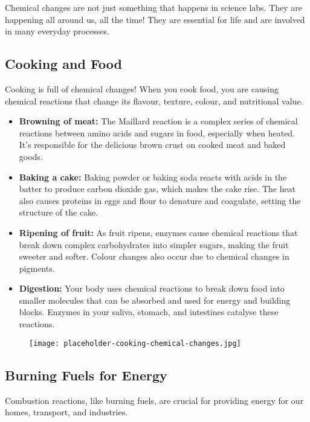 Chemical changes are not just something that happens in science labs. They are happening all around us, all the time!  They are essential for life and are involved in many everyday processes.

\subsection{Cooking and Food}

Cooking is full of chemical changes! When you cook food, you are causing chemical reactions that change its flavour, texture, colour, and nutritional value.

\begin{itemize}
    \item \textbf{Browning of meat:}  The Maillard reaction is a complex series of chemical reactions between amino acids and sugars in food, especially when heated. It's responsible for the delicious brown crust on cooked meat and baked goods.
    \item \textbf{Baking a cake:}  Baking powder or baking soda reacts with acids in the batter to produce carbon dioxide gas, which makes the cake rise. The heat also causes proteins in eggs and flour to denature and coagulate, setting the structure of the cake.
    \item \textbf{Ripening of fruit:} As fruit ripens, enzymes cause chemical reactions that break down complex carbohydrates into simpler sugars, making the fruit sweeter and softer. Colour changes also occur due to chemical changes in pigments.
    \item \textbf{Digestion:}  Your body uses chemical reactions to break down food into smaller molecules that can be absorbed and used for energy and building blocks. Enzymes in your saliva, stomach, and intestines catalyse these reactions.
\end{itemize}

\begin{figure}
\centering
\texttt{[image: placeholder-cooking-chemical-changes.jpg]}
\end{figure}

\subsection{Burning Fuels for Energy}

Combustion reactions, like burning fuels, are crucial for providing energy for our homes, transport, and industries.

